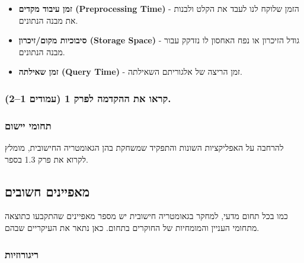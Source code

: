 \documentclass[
]{book}
\theoremstyle{definition}
\theoremstyle{definition}
\theoremstyle{definition}
\theoremstyle{definition}
\theoremstyle{remark}
\begin{document}
\begin{itemize}
\item
  \textbf{זמן עיבוד מקדים (Preprocessing Time)} - הזמן שלוקח לנו לעבד את הקלט ולבנות את מבנה הנתונים.
\item
  \textbf{סיבוכיות מקום/זיכרון (Storage Space)} - גודל הזיכרון או נפח האחסון לו נזדקק עבור מבנה הנתונים.
\item
  \textbf{זמן שאילתה (Query Time)} - זמן הריצה של אלגוריתם השאילתה.
\end{itemize}

\hypertarget{ux5e7ux5e8ux5d0ux5d5-ux5d0ux5ea-ux5d4ux5d4ux5e7ux5d3ux5deux5d4-ux5dcux5e4ux5e8ux5e7-1-ux5e2ux5deux5d5ux5d3ux5d9ux5dd-12.}{%
\subsubsection*{\texorpdfstring{\textbf{קראו את ההקדמה לפרק 1 (עמודים 1--2).}}{קראו את ההקדמה לפרק 1 (עמודים 1--2).}}\label{ux5e7ux5e8ux5d0ux5d5-ux5d0ux5ea-ux5d4ux5d4ux5e7ux5d3ux5deux5d4-ux5dcux5e4ux5e8ux5e7-1-ux5e2ux5deux5d5ux5d3ux5d9ux5dd-12.}}

\hypertarget{ux5eaux5d7ux5d5ux5deux5d9-ux5d9ux5d9ux5e9ux5d5ux5dd}{%
\subsubsection*{\texorpdfstring{\textbf{תחומי יישום}}{תחומי יישום}}\label{ux5eaux5d7ux5d5ux5deux5d9-ux5d9ux5d9ux5e9ux5d5ux5dd}}

להרחבה על האפליקציות השונות והתפקיד שמשחקת בהן הגאומטריה החישובית, מומלץ לקרוא את פרק 1.3 בספר.

\hypertarget{ux5deux5d0ux5e4ux5d9ux5d9ux5e0ux5d9ux5dd-ux5d7ux5e9ux5d5ux5d1ux5d9ux5dd}{%
\subsection*{\texorpdfstring{\textbf{מאפיינים חשובים}}{מאפיינים חשובים}}\label{ux5deux5d0ux5e4ux5d9ux5d9ux5e0ux5d9ux5dd-ux5d7ux5e9ux5d5ux5d1ux5d9ux5dd}}

כמו בכל תחום מדעי, למחקר בגאומטריה חישובית יש מספר מאפיינים שהתקבעו כתוצאה מתחומי העניין והמומחיות של החוקרים בתחום. כאן נתאר את העיקריים שבהם.

\hypertarget{ux5e8ux5d9ux5d2ux5d5ux5e8ux5d5ux5d6ux5d9ux5d5ux5ea}{%
\subsubsection*{\texorpdfstring{\textbf{ריגורוזיות}}{ריגורוזיות}}\label{ux5e8ux5d9ux5d2ux5d5ux5e8ux5d5ux5d6ux5d9ux5d5ux5ea}}
\end{document}
